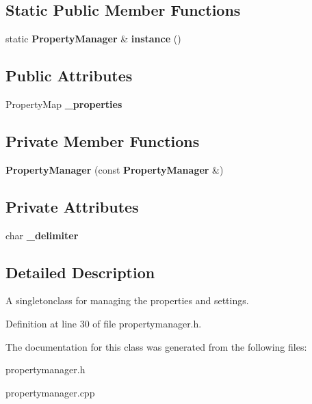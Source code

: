 \subsection*{Static Public Member Functions}
\begin{DoxyCompactItemize}
\item 
static {\bf Property\-Manager} \& {\bfseries instance} ()\label{classsfs__visualizer_1_1PropertyManager_a306ceed7e3dee0ac55a0f8248c796e26}

\end{DoxyCompactItemize}
\subsection*{Public Attributes}
\begin{DoxyCompactItemize}
\item 
Property\-Map {\bfseries \-\_\-properties}\label{classsfs__visualizer_1_1PropertyManager_a8d38fb0419d09a948cf3b796a4118a8a}

\end{DoxyCompactItemize}
\subsection*{Private Member Functions}
\begin{DoxyCompactItemize}
\item 
{\bfseries Property\-Manager} (const {\bf Property\-Manager} \&)\label{classsfs__visualizer_1_1PropertyManager_a7aed06263d25b69b4004c253a2edf6fa}

\end{DoxyCompactItemize}
\subsection*{Private Attributes}
\begin{DoxyCompactItemize}
\item 
char {\bfseries \-\_\-delimiter}\label{classsfs__visualizer_1_1PropertyManager_a98d71695ff7a18e4721d06f8637fbd12}

\end{DoxyCompactItemize}


\subsection{Detailed Description}
A singletonclass for managing the properties and settings. 

Definition at line 30 of file propertymanager.\-h.



The documentation for this class was generated from the following files\-:\begin{DoxyCompactItemize}
\item 
propertymanager.\-h\item 
propertymanager.\-cpp\end{DoxyCompactItemize}
